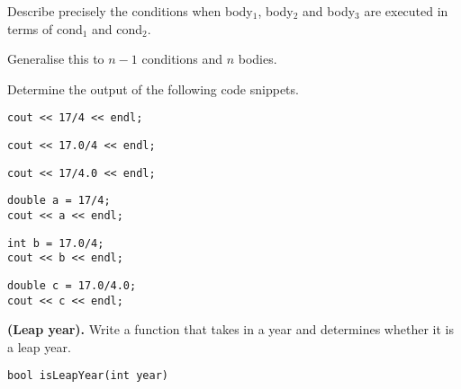 \begin{questions}
Describe precisely the conditions when body$_1$, body$_2$ and body$_3$ are executed in terms of cond$_1$ and cond$_2$.

Generalise this to $n-1$ conditions and $n$ bodies.

 Determine the output of the following code snippets.

\begin{parts}
\item 
\begin{lstlisting}
cout << 17/4 << endl;
\end{lstlisting}

\item 
\begin{lstlisting}
cout << 17.0/4 << endl;
\end{lstlisting}

\item 
\begin{lstlisting}
cout << 17/4.0 << endl;
\end{lstlisting}

\item 
\begin{lstlisting}
double a = 17/4;
cout << a << endl;
\end{lstlisting}

\item 
\begin{lstlisting}
int b = 17.0/4;
cout << b << endl;
\end{lstlisting}

\item 
\begin{lstlisting}
double c = 17.0/4.0;
cout << c << endl;
\end{lstlisting}
\end{parts}

\label{q:mod}
\miquestion \textbf{(Leap year).} Write a function that takes in a year and determines whether it is a leap year.

\begin{lstlisting}
bool isLeapYear(int year)
\end{lstlisting}


\end{questions}
